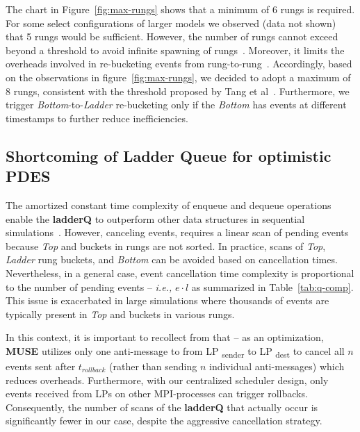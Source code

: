 The chart in Figure~\ref{fig:max-rungs} shows that a minimum of 6 rungs is required. For some select configurations of larger models we observed (data not shown) that 5 rungs would be sufficient. However, the number of rungs cannot exceed beyond a threshold to avoid infinite spawning of rungs~\cite{tang-05}.  Moreover, it limits the overheads involved in re-bucketing events from rung-to-rung~\cite{tang-05}. Accordingly, based on the observations in figure~\ref{fig:max-rungs}, we decided to adopt a maximum of 8 rungs, consistent with the threshold proposed by Tang et al~\cite{tang-05}. Furthermore, we trigger \emph{Bottom}-to-\emph{Ladder} re-bucketing only if the \emph{Bottom} has events at different timestamps to further reduce inefficiencies.

\subsection{Shortcoming of Ladder Queue for optimistic PDES}\label{sec:lq-prob}

The amortized constant time complexity of enqueue and dequeue operations enable the \textbf{ladderQ} to outperform other data structures in sequential simulations~\cite{dickman-13,franceschini-15,tang-05}.
However, canceling events, requires a linear scan of pending events because \emph{Top} and buckets in rungs are not sorted. In practice, scans of \emph{Top}, \emph{Ladder} rung buckets, and \emph{Bottom} can
be avoided based on cancellation times. Nevertheless, in a general case, event cancellation time complexity is proportional to the number of pending events -- \textit{i.e., } $e\cdot l$ as summarized in
Table~\ref{tab:q-comp}. This issue is exacerbated in large simulations where thousands of events are typically present in \emph{Top} and buckets in various rungs.

In this context, it is important to recollect from that -- as an optimization, \textbf{MUSE} utilizes only one anti-message to from LP \textsubscript{sender} to LP \textsubscript{dest} to cancel all $n$ events sent after $t_{rollback}$ (rather than sending $n$ individual anti-messages) which reduces overheads. Furthermore, with our centralized scheduler design, only events received from LPs on
other MPI-processes can trigger rollbacks. Consequently, the number of scans of the \textbf{ladderQ} that actually occur is significantly fewer in our case, despite the aggressive cancellation strategy.

